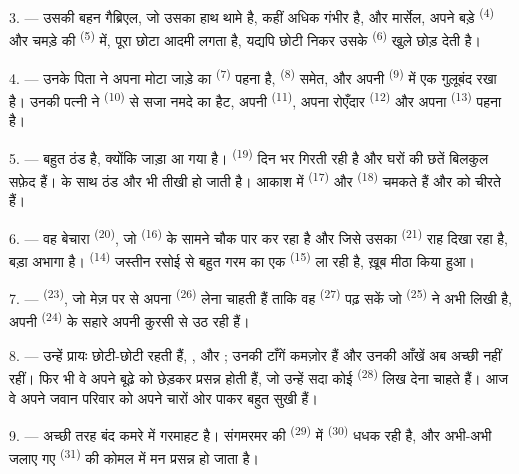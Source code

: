 3. --- उसकी बहन गैब्रिएल, जो उसका हाथ थामे है, कहीं अधिक गंभीर है, और मार्सेल,
अपने बड़े  \textsuperscript{(4)} और चमड़े की 
\textsuperscript{(5)} में, पूरा छोटा आदमी लगता है, यद्यपि छोटी निकर उसके
 \textsuperscript{(6)} खुले छोड़ देती है।

4. --- उनके पिता ने अपना मोटा जाड़े का  \textsuperscript{(7)}
पहना है,  \textsuperscript{(8)} समेत, और अपनी 
\textsuperscript{(9)} में एक गुलूबंद रखा है। उनकी पत्नी ने 
\textsuperscript{(10)} से सजा नमदे का हैट, अपनी  \textsuperscript{(11)},
अपना रोएँदार  \textsuperscript{(12)} और अपना 
\textsuperscript{(13)} पहना है।

5. --- बहुत ठंड है, क्योंकि जाड़ा आ गया है।  \textsuperscript{(19)}
दिन भर गिरती रही है और घरों की छतें बिलकुल सफ़ेद हैं।  के साथ ठंड
और भी तीखी हो जाती है। आकाश में  \textsuperscript{(17)} और
 \textsuperscript{(18)} चमकते हैं और  को चीरते हैं।

\VUsaut{4.2mm}
\VUsaut{3.0mm}

6. --- वह बेचारा  \textsuperscript{(20)}, जो
 \textsuperscript{(16)} के सामने चौक पार कर रहा है और जिसे
उसका  \textsuperscript{(21)} राह दिखा रहा है, बड़ा अभागा है। 
\textsuperscript{(14)} जस्तीन रसोई से बहुत गरम  का एक
 \textsuperscript{(15)} ला रही है, ख़ूब मीठा किया हुआ।

7. ---  \textsuperscript{(23)}, जो मेज़ पर से अपना
 \textsuperscript{(26)} लेना चाहती हैं ताकि वह 
\textsuperscript{(27)} पढ़ सकें जो  \textsuperscript{(25)} ने अभी
लिखी है, अपनी  \textsuperscript{(24)} के सहारे अपनी कुरसी से उठ रही
हैं।

8. --- उन्हें प्रायः छोटी-छोटी  रहती हैं, ,
 और ; उनकी टाँगें कमज़ोर हैं और उनकी आँखें
अब अच्छी नहीं रहीं। फिर भी वे अपने बूढ़े  को छेड़कर प्रसन्न होती
हैं, जो उन्हें सदा कोई  \textsuperscript{(28)} लिख देना चाहते हैं।
आज वे अपने जवान परिवार को अपने चारों ओर पाकर बहुत सुखी हैं।

9. --- अच्छी तरह बंद कमरे में गरमाहट है। संगमरमर की 
\textsuperscript{(29)} में  \textsuperscript{(30)} धधक रही है, और
अभी-अभी जलाए गए  \textsuperscript{(31)} की कोमल  में
मन प्रसन्न हो जाता है।

